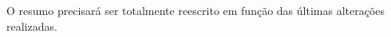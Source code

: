 \documentclass[
	12pt,               %
	openright,          %
	oneside,            %
	a4paper,            %
	english,            %
	brazil              %
	]{abntex2}
\begin{document}
\setlength{\absparsep}{18pt} %
\begin{resumo}




O resumo precisará ser totalmente reescrito em função das últimas alterações realizadas.


\end{resumo}
\end{document}
